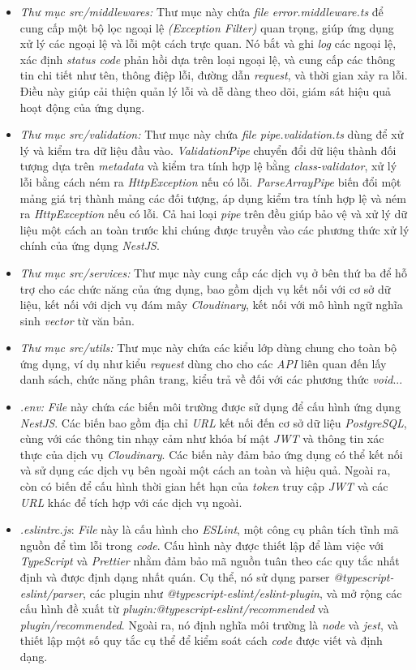 \begin{itemize}
    \item \textit{Thư mục src/middlewares:} Thư mục này chứa \textit{file error.middleware.ts} để cung cấp một bộ lọc ngoại lệ \textit{(Exception Filter)} quan trọng, giúp ứng dụng xử lý các ngoại lệ và lỗi một cách trực quan. Nó bắt và ghi \textit{log} các ngoại lệ, xác định \textit{status code} phản hồi dựa trên loại ngoại lệ, và cung cấp các thông tin chi tiết như tên, thông điệp lỗi, đường dẫn \textit{request}, và thời gian xảy ra lỗi. Điều này giúp cải thiện quản lý lỗi và dễ dàng theo dõi, giám sát hiệu quả hoạt động của ứng dụng.
    \item \textit{Thư mục src/validation:} Thư mục này chứa \textit{file pipe.validation.ts}  dùng để xử lý và kiểm tra dữ liệu đầu vào. \textit{ValidationPipe} chuyển đổi dữ liệu thành đối tượng dựa trên \textit{metadata} và kiểm tra tính hợp lệ bằng \textit{class-validator}, xử lý lỗi bằng cách ném ra \textit{HttpException} nếu có lỗi. \textit{ParseArrayPipe} biến đổi một mảng giá trị thành mảng các đối tượng, áp dụng kiểm tra tính hợp lệ và ném ra \textit{HttpException} nếu có lỗi. Cả hai loại \textit{pipe} trên đều giúp bảo vệ và xử lý dữ liệu một cách an toàn trước khi chúng được truyền vào các phương thức xử lý chính của ứng dụng \textit{NestJS}.
    \item \textit{Thư mục src/services:} Thư mục này cung cấp các dịch vụ ở bên thứ ba để hỗ trợ cho các chức năng của ứng dụng, bao gồm dịch vụ kết nối với cơ sở dữ liệu, kết nối với dịch vụ đám mây \textit{Cloudinary}, kết nối với mô hình ngữ nghĩa sinh \textit{vector} từ văn bản.
    \item \textit{Thư mục src/utils:} Thư mục này chứa các kiểu lớp dùng chung cho toàn bộ ứng dụng, ví dụ như kiểu \textit{request} dùng cho cho các \textit{API} liên quan đến lấy danh sách, chức năng phân trang, kiểu trả về đối với các phương thức \textit{void}...
    \item \textit{.env:} \textit{File} này chứa các biến môi trường được sử dụng để cấu hình ứng dụng \textit{NestJS}. Các biến bao gồm địa chỉ \textit{URL} kết nối đến cơ sở dữ liệu \textit{PostgreSQL}, cùng với các thông tin nhạy cảm như khóa bí mật \textit{JWT} và thông tin xác thực của dịch vụ \textit{Cloudinary}. Các biến này đảm bảo ứng dụng có thể kết nối và sử dụng các dịch vụ bên ngoài một cách an toàn và hiệu quả. Ngoài ra, còn có biến để cấu hình thời gian hết hạn của \textit{token} truy cập \textit{JWT} và các \textit{URL} khác để tích hợp với các dịch vụ ngoài.
    \item \textit{.eslintrc.js}: \textit{File} này là cấu hình cho \textit{ESLint}, một công cụ phân tích tĩnh mã nguồn để tìm lỗi trong \textit{code}. Cấu hình này được thiết lập để làm việc với \textit{TypeScript} và \textit{Prettier} nhằm đảm bảo mã nguồn tuân theo các quy tắc nhất định và được định dạng nhất quán. Cụ thể, nó sử dụng parser \textit{@typescript-eslint/parser}, các plugin như \textit{@typescript-eslint/eslint-plugin}, và mở rộng các cấu hình đề xuất từ \textit{plugin:@typescript-eslint/recommended} và \textit{plugin/recommended}. Ngoài ra, nó định nghĩa môi trường là \textit{node} và \textit{jest}, và thiết lập một số quy tắc cụ thể để kiểm soát cách \textit{code} được viết và định dạng.

\end{itemize}
